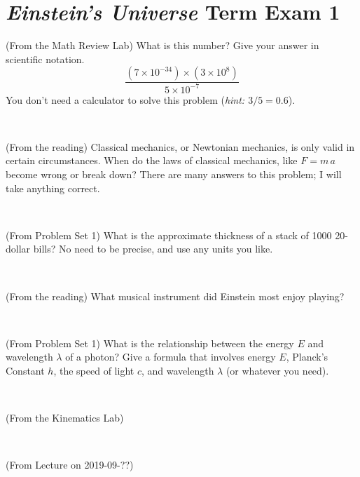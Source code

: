 \documentclass[12pt, letterpaper]{article}
\begin{document}
\section*{\textsl{Einstein's Universe} Term Exam 1}
\setcounter{problem}{1}


\begin{problem} (From the Math Review Lab)
What is this number? Give your answer in scientific notation.
$$
\frac{(7\times10^{-34})\times(3\times10^8)}{5\times10^{-7}}
$$
You don't need a calculator to solve this problem (\textit{hint: $3/5=0.6$}).
\end{problem}


\vfill ~

\begin{problem} (From the reading)
Classical mechanics, or Newtonian mechanics, is only valid in certain
circumstances. When do the laws of classical mechanics, like $F =
m\,a$ become wrong or break down? There are many answers to this
problem; I will take anything correct.
\end{problem}


\vfill ~

\begin{problem} (From Problem Set 1)
What is the approximate thickness of a stack of 1000 20-dollar bills?
No need to be precise, and use any units you like.
\end{problem}


\vfill ~

\begin{problem} (From the reading)
What musical instrument did Einstein most enjoy playing?
\end{problem}


\vfill ~


\clearpage


\begin{problem} (From Problem Set 1)
What is the relationship between the energy $E$ and wavelength
$\lambda$ of a photon? Give a formula that involves energy $E$,
Planck's Constant $h$, the speed of light $c$, and wavelength
$\lambda$ (or whatever you need).
\end{problem}

\vfill ~

\begin{problem} (From the Kinematics Lab)

\end{problem}


\vfill ~

\begin{problem} (From Lecture on 2019-09-??)
\end{problem}
\end{document}
